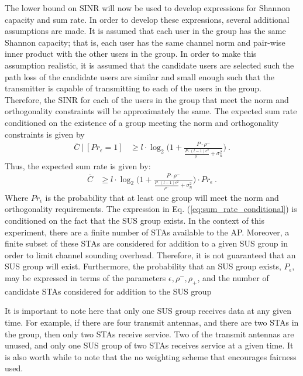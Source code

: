 The lower bound on SINR will now be used to develop expressions for Shannon capacity and sum rate. In order to develop these expressions, several additional assumptions are made. It is assumed that each user in the group has the same Shannon capacity; that is, each user has the same channel norm and pair-wise inner product with the other users in the group. In order to make this assumption realistic, it is assumed that the candidate users are selected such the path loss of the candidate users are similar and small enough such that the transmitter is capable of transmitting to each of the users in the group. Therefore, the SINR for each of the users in the group that meet the norm and orthogonality constraints will be approximately the same. The expected sum rate conditioned on the existence of a group meeting the norm and orthogonality constraints is given by
\begin{equation}\label{eq:sum_rate_conditional}
    \begin{aligned}
        \overline{C} \ \vert \ [Pr_\epsilon = 1] &\geq  l\cdot \log_2\bigg(1+\frac{P \cdot \rho^-}{\frac{P\cdot(l-1)\epsilon^2}{\rho^-}  + \sigma_n^2}\bigg) \ .
    \end{aligned}
\end{equation}
Thus, the expected sum rate is given by:
\begin{equation}\label{eq:sum_rate}
    \begin{aligned}
        \overline{C} &\geq  l\cdot \log_2\bigg(1+\frac{P \cdot \rho^-}{\frac{P\cdot(l-1)\epsilon^2}{\rho^-}  + \sigma_n^2}\bigg) \cdot Pr_\epsilon \ .
    \end{aligned}
\end{equation}
Where $Pr_\epsilon$ is the probability that at least one group will meet the norm and orthogonality requirements. The expression in Eq. (\ref{eq:sum_rate_conditional}) is conditioned on the fact that the SUS group exists. In the context of this experiment, there are a finite number of STAs available to the AP. Moreover, a finite subset of these STAs are considered for addition to a given SUS group in order to limit channel sounding overhead. Therefore, it is not guaranteed that an SUS group will exist. Furthermore, the probability that an SUS group exists, $P_{\epsilon}$, may be expressed in terms of the parameters $\epsilon,\rho^-,\rho_+$, and the number of candidate STAs considered for addition to the SUS group \cite{Swannack2005}

It is important to note here that only one SUS group receives data at any given time. For example, if there are four transmit antennas, and there are two STAs in the group, then only two STAs receive service. Two of the transmit antennas are unused, and only one SUS group of two STAs receives service at a given time. It is also worth while to note that the no weighting scheme that encourages fairness used.


